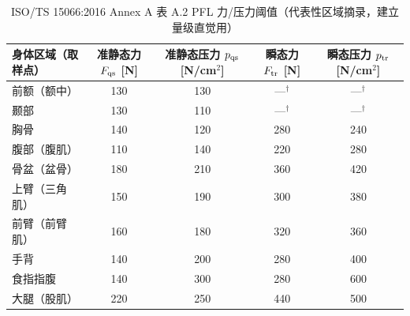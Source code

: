 \begin{table}[H]\centering\small
\caption{ISO/TS 15066:2016 Annex A 表 A.2 PFL 力/压力阈值（代表性区域摘录，建立量级直觉用）}
\label{tab:cs-iso}
\begin{tabular}{lcccc}
\toprule
身体区域（取样点） & 准静态力 $F_{\rm qs}$ [N] & 准静态压力 $p_{\rm qs}$ [N/cm$^2$] & 瞬态力 $F_{\rm tr}$ [N] & 瞬态压力 $p_{\rm tr}$ [N/cm$^2$] \\
\midrule
前额（额中）       & 130 & 130 & ---$^\dagger$ & ---$^\dagger$ \\
颞部              & 130 & 110 & ---$^\dagger$ & ---$^\dagger$ \\
胸骨              & 140 & 120 & 280 & 240 \\
腹部（腹肌）       & 110 & 140 & 220 & 280 \\
骨盆（盆骨）       & 180 & 210 & 360 & 420 \\
上臂（三角肌）     & 150 & 190 & 300 & 380 \\
前臂（前臂肌）     & 160 & 180 & 320 & 360 \\
手背              & 140 & 200 & 280 & 400 \\
食指指腹           & 140 & 300 & 280 & 600 \\
大腿（股肌）       & 220 & 250 & 440 & 500 \\
\bottomrule
\end{tabular}
\end{table}


\begin{finenote}
\end{finenote}


